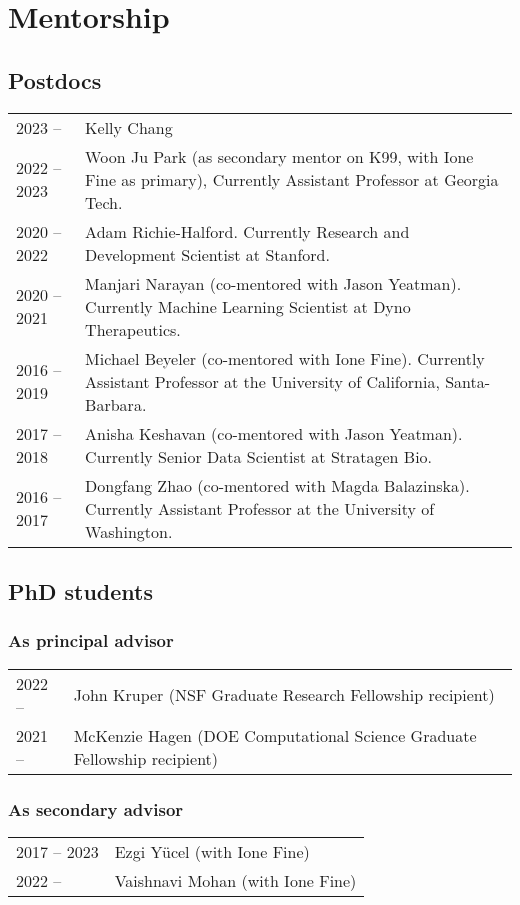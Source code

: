\documentclass[11pt,fullpage]{article}
\begin{document}
\section*{Mentorship}

\subsection*{Postdocs}
\begin{tabular}{p{}p{}}
2023 -- & Kelly Chang \\
2022 -- 2023 & Woon Ju Park (as secondary mentor on K99, with Ione Fine as primary), Currently Assistant Professor at Georgia Tech.\\
2020 -- 2022 & Adam Richie-Halford. Currently Research and Development Scientist at Stanford. \\
2020 -- 2021 & Manjari Narayan (co-mentored with Jason Yeatman). Currently Machine Learning Scientist at Dyno Therapeutics.\\
2016 -- 2019 & Michael Beyeler (co-mentored  with Ione Fine). Currently Assistant Professor at the University of California, Santa-Barbara.\\
2017 -- 2018 & Anisha Keshavan (co-mentored  with Jason Yeatman). Currently Senior Data Scientist at Stratagen Bio. \\
2016 -- 2017 & Dongfang Zhao (co-mentored with Magda Balazinska). Currently Assistant Professor at the University of Washington.
\end{tabular}

\subsection*{PhD students}

\subsubsection*{As principal advisor}
\begin{tabular}{p{}p{}}
2022 --  & John Kruper (NSF Graduate Research Fellowship recipient)\\
2021 --  &  McKenzie Hagen (DOE Computational Science Graduate Fellowship recipient)\\
\end{tabular}

\subsubsection*{As secondary advisor}
\begin{tabular}{p{}p{}}
2017 -- 2023 & Ezgi Y\"{u}cel (with Ione Fine) \\
2022 -- & Vaishnavi Mohan (with Ione Fine)\\
\end{tabular}
\end{document}
